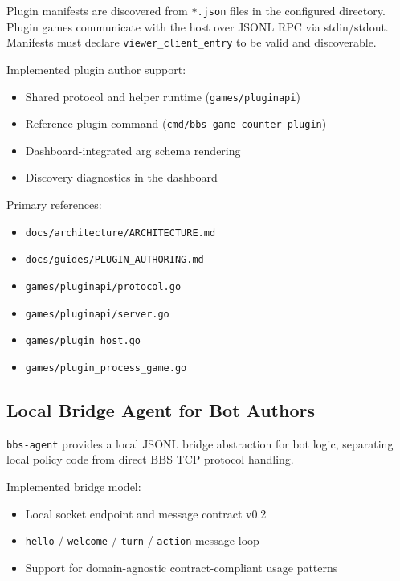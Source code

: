 \documentclass[11pt]{article}
\begin{document}
Plugin manifests are discovered from \texttt{*.json} files in the configured directory. Plugin games communicate with the host over JSONL RPC via stdin/stdout. Manifests must declare \texttt{viewer\_client\_entry} to be valid and discoverable.

Implemented plugin author support:
\begin{itemize}[leftmargin=*]
  \item Shared protocol and helper runtime (\texttt{games/pluginapi})
  \item Reference plugin command (\texttt{cmd/bbs-game-counter-plugin})
  \item Dashboard-integrated arg schema rendering
  \item Discovery diagnostics in the dashboard
\end{itemize}

Primary references:
\begin{itemize}[leftmargin=*]
  \item \texttt{docs/architecture/ARCHITECTURE.md}
  \item \texttt{docs/guides/PLUGIN\_AUTHORING.md}
  \item \texttt{games/pluginapi/protocol.go}
  \item \texttt{games/pluginapi/server.go}
  \item \texttt{games/plugin\_host.go}
  \item \texttt{games/plugin\_process\_game.go}
\end{itemize}

\subsection{Local Bridge Agent for Bot Authors}
\texttt{bbs-agent} provides a local JSONL bridge abstraction for bot logic, separating local policy code from direct BBS TCP protocol handling.

Implemented bridge model:
\begin{itemize}[leftmargin=*]
  \item Local socket endpoint and message contract v0.2
  \item \texttt{hello} / \texttt{welcome} / \texttt{turn} / \texttt{action} message loop
  \item Support for domain-agnostic contract-compliant usage patterns
\end{itemize}
\end{document}

